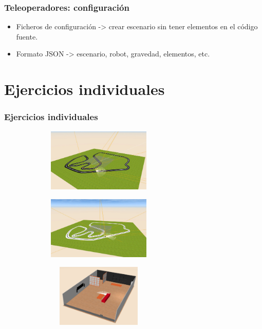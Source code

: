 \documentclass[xcolor={table}]{beamer}
\begin{document}
		\begin{frame}
			\frametitle{Teleoperadores: configuración}
			\newline
		    \begin{itemize}
		        \item Ficheros de configuración ->  crear escenario sin tener elementos en el código fuente.
		        \item Formato JSON ->  escenario,  robot, gravedad, elementos, etc. 
		    \end{itemize}
		\end{frame}
		
		\section{Ejercicios individuales}
		\begin{frame}
			\frametitle{Ejercicios individuales}
	  \begin{figure}[ht]
        \centering
          \begin{subfigure}{\textwidth}
            \includegraphics[width=5.5cm, height=3cm]{img/pibot_vision.JPG}
        \label{fig:vision}
        \end{subfigure}\hfill
        \begin{subfigure}{\textwidth}
            \includegraphics[width=5.5cm, height=3cm]{img/siguelineas_ir.JPG}
        \label{fig:ir}
        \end{subfigure}\hfill
        \begin{subfigure}{\textwidth}
            \includegraphics[width=5.5cm, height=3cm]{img/bump&go.png}

\end{subfigure}
\end{figure}
\end{frame}
\end{document}
